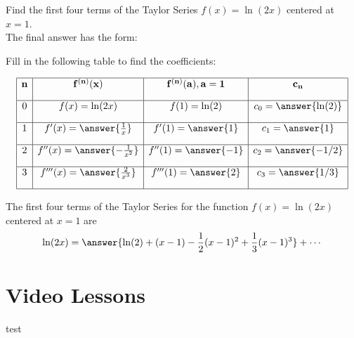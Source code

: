 \documentclass{ximera}
\begin{document}
\begin{problem} Find the first four terms of the Taylor Series $f(x) = \ln(2x)$ centered at $x = 1$.\\


The final answer has the form:
\begin{center}
\begin{multipleChoice}
\end{multipleChoice}
\end{center}

Fill in the following table to find the coefficients:

\[
\begin{array}{|c|c|c|c|} 
\hline
\bf{n} & \bf{f^{(n)}(x)} & \bf{f^{(n)}(a), a = 1} & \bf{c_n} \\[1em] 
\hline
 0 & f(x) = \ln(2x) & f(1) = \ln(2) & c_0 = \answer{\ln(2)} \\[1em]
\hline
1 & f'(x) = \answer{\frac{1}{x}} & f'(1) = \answer{1} & c_1 = \answer{1} \\[1em]
\hline
 2 & f''(x) =\answer{-\frac{1}{x^2}} & f''(1) = \answer{-1} & c_2 = \answer{-1/2} \\[1em]
\hline
 3 & f'''(x) =\answer{\frac{2}{x^3}} & f'''(1) = \answer{2} & c_3 = \answer{1/3}\\[1em]
\hline
\end{array}
\]


The first four terms of the Taylor Series for the function $f(x) = \ln(2x)$ centered at $x = 1$ are
\[
\ln(2x) = \answer{\ln(2) + (x-1) -\frac12(x-1)^2 + \frac13(x-1)^3} + \cdots
\]


\end{problem}





\section{Video Lessons}

\begin{center}
\begin{foldable}
\end{foldable}
\end{center}



\begin{center}
\begin{foldable}
\end{foldable}
\end{center}

test
\end{document}
